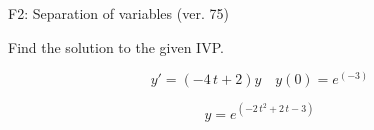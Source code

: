 \begin{exercise}
  \begin{exerciseTitle}F2: Separation of variables (ver. 75)\end{exerciseTitle}
  \begin{exerciseStatement}
    
Find the solution to the given IVP.

    
\[y'=( -4 \, t + 2 )y\hspace{1em} y(0)= e^{\left(-3\right)}\]

  \end{exerciseStatement}
  \begin{exerciseAnswer}
    
\[y= e^{\left(-2 \, t^{2} + 2 \, t - 3\right)}\]

  \end{exerciseAnswer}
\end{exercise}